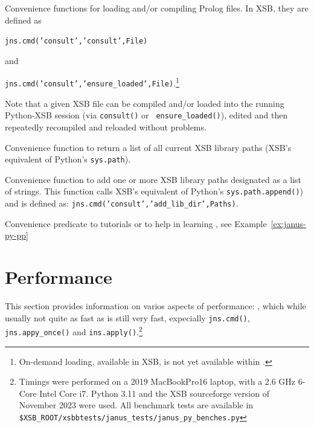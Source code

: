 \begin{description}

%
  Convenience functions for loading and/or compiling Prolog files.  In
  XSB, they are defined as

  {\tt jns.cmd('consult','consult',File)}

\noindent
and

  {\tt jns.cmd('consult','ensure\_loaded',File)}.\footnote{On-demand
  loading, available in XSB, is not yet available within \januspy{}.}

  Note that a given XSB file can be compiled and/or loaded into the
  running Python-XSB session (via {\tt consult()} or {\tt
    ensure\_loaded()}), edited and then repeatedly recompiled and
    reloaded without problems.

%  
  Convenience function to return a list of all current XSB library
  paths (XSB's equivalent of Python's {\tt sys.path}).

%  
    Convenience function to add one or more XSB library paths
    designated as a list of strings.  This function calls XSB's
    equivalent of Python's {\tt sys.path.append()}) and is defined as:
    {\tt jns.cmd('consult','add\_lib\_dir',Paths)}.
  
  Convenience predicate to tutorials or to help in learning
  \januspy{}, see Example~\ref{ex:janus-py-pp}
\end{description}

\section{Performance} \label{sec:jns-perf}
%
This section provides information on varios aspects of \januspy{}
performance: \januspy , which while usually not quite as fast as
\janusplg{} is still very fast, expecially {\tt jns.cmd()}, {\tt
  jns.appy\_once()} and {\tt ins.apply()}.\footnote{Timings were
performed on a 2019 MacBookPro16 laptop, with a 2.6 GHz 6-Core Intel
Core i7.  Python 3.11 and the XSB sourceforge version of November 2023
were used.  All benchmark tests are available in {\tt
  \$XSB\_ROOT/xsbbtests/janus\_tests/janus\_py\_benches.py}}

